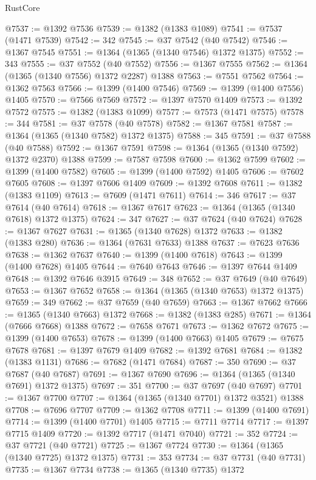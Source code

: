 \begin{lexlean}{RustCore}
\begin{coremodule}
@7537 := @1392 @7536
@7539 := @1382 (@1383 @1089)
@7541 := @7537 (@1471 @7539)
@7542 := 342
@7545 := @37 @7542 (@40 @7542)
@7546 := @1367 @7545
@7551 := @1364 (@1365 (@1340 @7546) @1372 @1375)
@7552 := 343
@7555 := @37 @7552 (@40 @7552)
@7556 := @1367 @7555
@7562 := @1364 (@1365 (@1340 @7556) @1372 @2287) @1388
@7563 := @7551 @7562
@7564 := @1362 @7563
@7566 := @1399 (@1400 @7546)
@7569 := @1399 (@1400 @7556) @1405
@7570 := @7566 @7569
@7572 := @1397 @7570 @1409
@7573 := @1392 @7572
@7575 := @1382 (@1383 @1099)
@7577 := @7573 (@1471 @7575)
@7578 := 344
@7581 := @37 @7578 (@40 @7578)
@7582 := @1367 @7581
@7587 := @1364 (@1365 (@1340 @7582) @1372 @1375)
@7588 := 345
@7591 := @37 @7588 (@40 @7588)
@7592 := @1367 @7591
@7598 := @1364 (@1365 (@1340 @7592) @1372 @2370) @1388
@7599 := @7587 @7598
@7600 := @1362 @7599
@7602 := @1399 (@1400 @7582)
@7605 := @1399 (@1400 @7592) @1405
@7606 := @7602 @7605
@7608 := @1397 @7606 @1409
@7609 := @1392 @7608
@7611 := @1382 (@1383 @1109)
@7613 := @7609 (@1471 @7611)
@7614 := 346
@7617 := @37 @7614 (@40 @7614)
@7618 := @1367 @7617
@7623 := @1364 (@1365 (@1340 @7618) @1372 @1375)
@7624 := 347
@7627 := @37 @7624 (@40 @7624)
@7628 := @1367 @7627
@7631 := @1365 (@1340 @7628) @1372
@7633 := @1382 (@1383 @280)
@7636 := @1364 (@7631 @7633) @1388
@7637 := @7623 @7636
@7638 := @1362 @7637
@7640 := @1399 (@1400 @7618)
@7643 := @1399 (@1400 @7628) @1405
@7644 := @7640 @7643
@7646 := @1397 @7644 @1409
@7648 := @1392 @7646 @3915
@7649 := 348
@7652 := @37 @7649 (@40 @7649)
@7653 := @1367 @7652
@7658 := @1364 (@1365 (@1340 @7653) @1372 @1375)
@7659 := 349
@7662 := @37 @7659 (@40 @7659)
@7663 := @1367 @7662
@7666 := @1365 (@1340 @7663) @1372
@7668 := @1382 (@1383 @285)
@7671 := @1364 (@7666 @7668) @1388
@7672 := @7658 @7671
@7673 := @1362 @7672
@7675 := @1399 (@1400 @7653)
@7678 := @1399 (@1400 @7663) @1405
@7679 := @7675 @7678
@7681 := @1397 @7679 @1409
@7682 := @1392 @7681
@7684 := @1382 (@1383 @1131)
@7686 := @7682 (@1471 @7684)
@7687 := 350
@7690 := @37 @7687 (@40 @7687)
@7691 := @1367 @7690
@7696 := @1364 (@1365 (@1340 @7691) @1372 @1375)
@7697 := 351
@7700 := @37 @7697 (@40 @7697)
@7701 := @1367 @7700
@7707 := @1364 (@1365 (@1340 @7701) @1372 @3521) @1388
@7708 := @7696 @7707
@7709 := @1362 @7708
@7711 := @1399 (@1400 @7691)
@7714 := @1399 (@1400 @7701) @1405
@7715 := @7711 @7714
@7717 := @1397 @7715 @1409
@7720 := @1392 @7717 (@1471 @7040)
@7721 := 352
@7724 := @37 @7721 (@40 @7721)
@7725 := @1367 @7724
@7730 := @1364 (@1365 (@1340 @7725) @1372 @1375)
@7731 := 353
@7734 := @37 @7731 (@40 @7731)
@7735 := @1367 @7734
@7738 := @1365 (@1340 @7735) @1372

\end{coremodule}
\end{lexlean}
